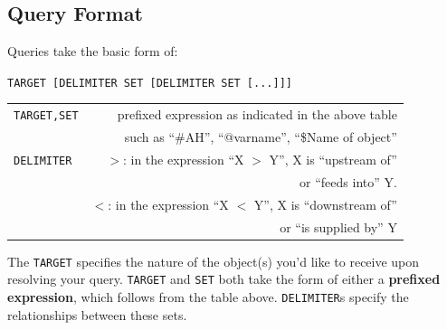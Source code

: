 \subsection{Query Format} %
\label{sub:query_format}
Queries take the basic form of:
\begin{center}
\verb+TARGET [DELIMITER SET [DELIMITER SET [...]]]+

\verb++

\begin{tabular}{| l | r |}
\hline
\verb+TARGET,SET+ & prefixed expression as indicated in the above table \\
& such as ``\#AH'', ``@varname'', ``\$Name of object'' \\ \hline
\verb+DELIMITER+& $>$: in the expression ``X $>$ Y'', X is ``upstream of'' \\
& or ``feeds into'' Y. \\
& $<$: in the expression ``X $<$ Y'', X is ``downstream of'' \\
& or ``is supplied by'' Y \\ \hline
\end{tabular}
\end{center}
The \verb+TARGET+ specifies the nature of the object(s) you'd like to receive upon resolving your query. \verb+TARGET+ and \verb+SET+ both take the form of either a {\bf prefixed expression}, which follows from the table above. \verb+DELIMITER+s specify the relationships between these sets.

